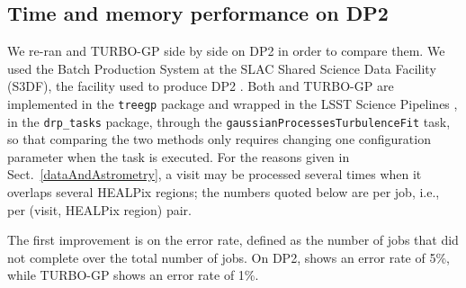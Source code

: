 \subsection{Time and memory performance on DP2}
\label{sec:errorRate}

We re-ran  and TURBO-GP side by side on DP2 in order to compare them.
We used the Batch Production System \citep{2022SPIE12189E..11J} at the SLAC Shared Science Data Facility (S3DF), the facility 
used to produce DP2 \citep{RTN-115}.
Both  and TURBO-GP are implemented in the \texttt{treegp} package and wrapped in the 
LSST Science Pipelines \citep{PSTN-019}, in the \texttt{drp\_tasks} package, through the \texttt{gaussianProcessesTurbulenceFit} task, 
so that comparing the two methods only requires changing one configuration parameter when the task is executed.
For the reasons given in Sect.~\ref{dataAndAstrometry}, a visit may be processed several times when it overlaps several HEALPix regions; 
the numbers quoted below are per job, i.e., per (visit, HEALPix region) pair.

The first improvement is on the error rate, defined as the number of jobs that did not complete over the total number of jobs.
On DP2,  shows an error rate of 5\%, while TURBO-GP shows an error rate of 1\%.



